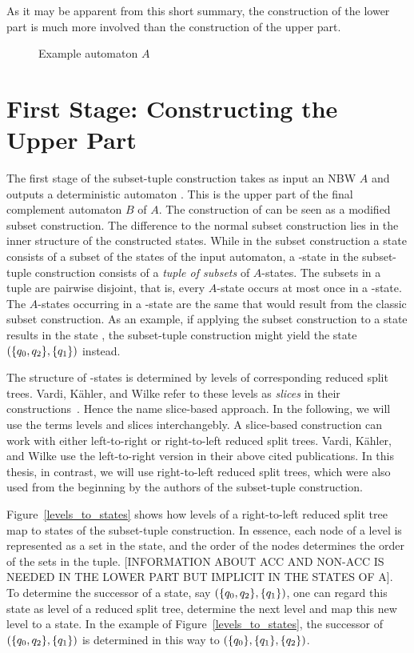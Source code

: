 As it may be apparent from this short summary, the construction of the lower part is much more involved than the construction of the upper part.

\begin{figure}
\begin{center}
\Automaton
\caption{Example automaton $A$}
\label{example_automaton}
\end{center}
\end{figure} 


\section{First Stage: Constructing the Upper Part}
The first stage of the subset-tuple construction takes as input an NBW $A$ and outputs a deterministic automaton \Bp. This \Bp is the upper part of the final complement automaton $B$ of $A$. The construction of \Bp can be seen as a modified subset construction. The difference to the normal subset construction lies in the inner structure of the constructed states. While in the subset construction a state consists of a subset of the states of the input automaton, a \Bp-state in the subset-tuple construction consists of a \emph{tuple of subsets} of $A$-states. The subsets in a tuple are pairwise disjoint, that is, every $A$-state occurs at most once in a \Bp-state. The $A$-states occurring in a \Bp-state are the same that would result from the classic subset construction. As an example, if applying the subset construction to a state  results in the state , the subset-tuple construction might yield the state $(\{q_{0},q_{2}\},\{q_{1}\})$ instead.

The structure of \Bp-states is determined by levels of corresponding reduced split trees. Vardi, Kähler, and Wilke refer to these levels as \emph{slices} in their constructions~\cite{vardi2007automata,2008_kaehler}. Hence the name slice-based approach. In the following, we will use the terms levels and slices interchangebly. A slice-based construction can work with either left-to-right or right-to-left reduced split trees. Vardi, Kähler, and Wilke use the left-to-right version in their above cited publications. In this thesis, in contrast, we will use right-to-left reduced split trees, which were also used from the beginning by the authors of the subset-tuple construction.

Figure~\ref{levels_to_states} shows how levels of a right-to-left reduced split tree map to states of the subset-tuple construction. In essence, each node of a level is represented as a set in the state, and the order of the nodes determines the order of the sets in the tuple. [INFORMATION ABOUT ACC AND NON-ACC IS NEEDED IN THE LOWER PART BUT IMPLICIT IN THE STATES OF A]. To determine the successor of a state, say $(\{q_{0},q_{2}\},\{q_{1}\})$, one can regard this state as level of a reduced split tree, determine the next level and map this new level to a state. In the example of Figure~\ref{levels_to_states}, the successor of $(\{q_{0},q_{2}\},\{q_{1}\})$ is determined in this way to $(\{q_{0}\},\{q_{1}\},\{q_{2}\})$.

